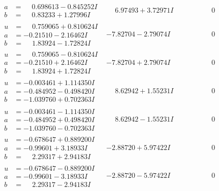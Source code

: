 \documentclass[1p]{elsarticle_modified}
\theoremstyle{definition}
\begin{document}
$$\begin{array}{c|c|c}
\begin{aligned}
a &= \phantom{-}0.698613 - 0.845252 I \\
b &= \phantom{-}0.83233 + 1.27996 I\end{aligned}
 & \phantom{-}6.97493 + 3.72971 I & \phantom{-0.000000 } 0 \\ \hline\begin{aligned}
u &= \phantom{-}0.759065 + 0.810624 I \\
a &= -0.21510 - 2.16462 I \\
b &= \phantom{-}1.83924 - 1.72824 I\end{aligned}
 & -7.82704 - 2.79074 I & \phantom{-0.000000 } 0 \\ \hline\begin{aligned}
u &= \phantom{-}0.759065 - 0.810624 I \\
a &= -0.21510 + 2.16462 I \\
b &= \phantom{-}1.83924 + 1.72824 I\end{aligned}
 & -7.82704 + 2.79074 I & \phantom{-0.000000 } 0 \\ \hline\begin{aligned}
u &= -0.003461 + 1.114350 I \\
a &= -0.484952 - 0.498420 I \\
b &= -1.039760 + 0.702363 I\end{aligned}
 & \phantom{-}8.62942 + 1.55231 I & \phantom{-0.000000 } 0 \\ \hline\begin{aligned}
u &= -0.003461 - 1.114350 I \\
a &= -0.484952 + 0.498420 I \\
b &= -1.039760 - 0.702363 I\end{aligned}
 & \phantom{-}8.62942 - 1.55231 I & \phantom{-0.000000 } 0 \\ \hline\begin{aligned}
u &= -0.678647 + 0.889200 I \\
a &= -0.99601 + 3.18933 I \\
b &= \phantom{-}2.29317 + 2.94183 I\end{aligned}
 & -2.88720 + 5.97422 I & \phantom{-0.000000 } 0 \\ \hline\begin{aligned}
u &= -0.678647 - 0.889200 I \\
a &= -0.99601 - 3.18933 I \\
b &= \phantom{-}2.29317 - 2.94183 I\end{aligned}
 & -2.88720 - 5.97422 I & \phantom{-0.000000 } 0 \\ \hline\begin{aligned}

\end{aligned}
\end{array}$$
\end{document}
